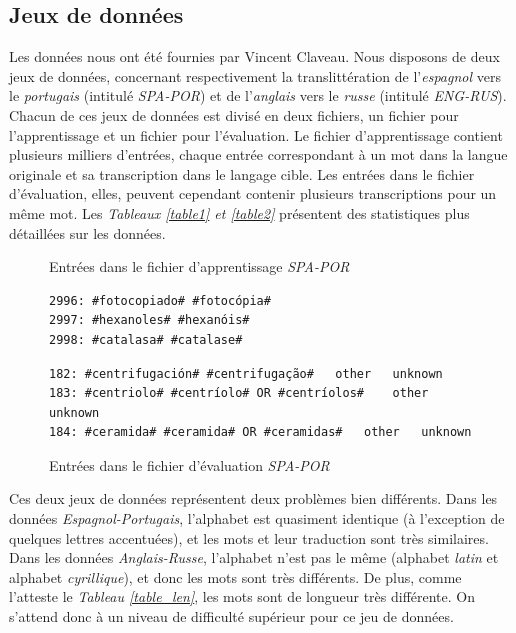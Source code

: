 \documentclass{article}
\begin{document}
\subsection{Jeux de données}
Les données nous ont été fournies par Vincent Claveau. Nous disposons de deux jeux de données, concernant respectivement la translittération de l'\emph{espagnol} vers le \emph{portugais} (intitulé \emph{SPA-POR}) et de l'\emph{anglais} vers le \emph{russe} (intitulé \emph{ENG-RUS}). Chacun de ces jeux de données est divisé en deux fichiers, un fichier pour l'apprentissage et un fichier pour l'évaluation. Le fichier d'apprentissage contient plusieurs milliers d'entrées, chaque entrée correspondant à un mot dans la langue originale et sa transcription dans le langage cible. Les entrées dans le fichier d'évaluation, elles, peuvent cependant contenir plusieurs transcriptions pour un même mot. Les \emph{Tableaux \ref{table1} et \ref{table2}} présentent des statistiques plus détaillées sur les données.

\begin{figure}[H]
    \caption{Entrées dans le fichier d'apprentissage \emph{SPA-POR}}
\begin{verbatim}
2996: #fotocopiado# #fotocópia#
2997: #hexanoles# #hexanóis#
2998: #catalasa# #catalase#
\end{verbatim}

\caption{Entrées dans le fichier d'évaluation \emph{SPA-POR}}
\begin{verbatim}
182: #centrifugación# #centrifugação#	other	unknown
183: #centriolo# #centríolo# OR #centríolos#	other	unknown
184: #ceramida# #ceramida# OR #ceramidas#	other	unknown
\end{verbatim}
\end{figure}

Ces deux jeux de données représentent deux problèmes bien différents. Dans les données \emph{Espagnol-Portugais}, l'alphabet est quasiment identique (à l'exception de quelques lettres accentuées), et les mots et leur traduction sont très similaires.
Dans les données \emph{Anglais-Russe}, l'alphabet n'est pas le même (alphabet \emph{latin} et alphabet \emph{cyrillique}), et donc les mots sont très différents. De plus, comme l'atteste le \emph{Tableau \ref{table_len}}, les mots sont de longueur très différente. On s'attend donc à un niveau de difficulté supérieur pour ce jeu de données.
\end{document}
